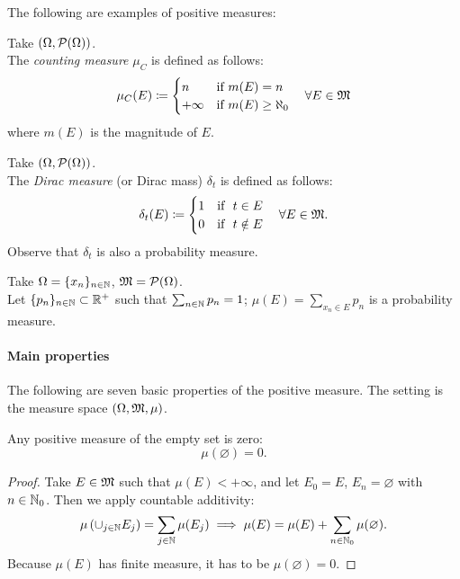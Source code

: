 The following are examples of positive measures:
\begin{exam}
	Take $(\Omega, \mathcal P(\Omega))$.\\
	The \emph{counting measure} $\mu_C$ is defined as follows:
    $$\mu_C(E) \coloneqq \begin{cases}
      n & \text{if } m(E) = n \\
      +\infty & \text{if } m(E) \ge \aleph_0
    \end{cases}
    \quad \forall E \in \mathfrak M
    $$
    where $m(E)$ is the magnitude of $E$.
\end{exam}
\begin{exam}
	Take $(\Omega, \mathcal P(\Omega))$.\\
	The \emph{Dirac measure} (or Dirac mass) $\delta_{t}$ is defined as follows:
    $$\delta_{t}(E) \coloneqq \begin{cases}
      1 & \text{if }\ t \in E \\
      0 & \text{if }\ t \notin E
    \end{cases}
    \quad \forall E \in \mathfrak M.
    $$
    Observe that $\delta_{t}$ is also a probability measure.
\end{exam}
\begin{exam}
	Take $\Omega = \{x_n\}_{n \in \mathbb N}$, $\mathfrak M = \mathcal P(\Omega)$.\\
	Let $\{p_n\}_{n \in \mathbb N} \subset \mathbb R^+$ such that $\sum_{n \in \mathbb N} p_n = 1$; $\mu(E) = \sum_{x_n \in E} p_n$ is a probability measure.
\end{exam}

\paragraph{Main properties} The following are seven basic properties of the positive measure. The setting is the measure space $(\Omega, \mathfrak M, \mu)$.

\begin{prop}
	Any positive measure of the empty set is zero: 
	$$
		\mu(\varnothing) 
		= 0
	.
	$$
\end{prop}
\begin{proof}
	Take $E \in \mathfrak M$ such that $\mu(E) < +\infty$, and let $E_0 = E$, $E_n = \varnothing$ with $n \in \mathbb N_0$. Then we apply countable additivity:
	$$\mu \left( \cup_{j \in \mathbb N} E_j \right) = \sum_{j \in \mathbb N} \mu(E_j)
	\implies \mu(E) = \mu(E) + \sum_{n \in \mathbb N_0} \mu(\varnothing).$$
	Because $\mu(E)$ has finite measure, it has to be $\mu(\varnothing) = 0$.
\end{proof}

